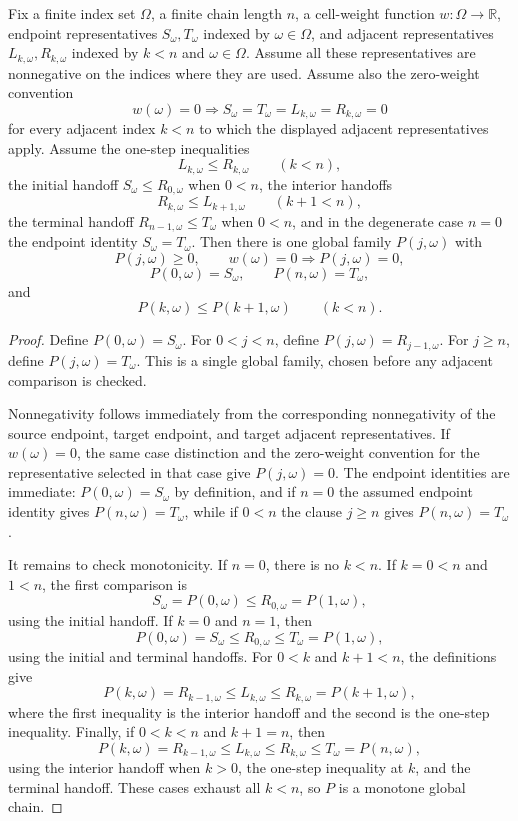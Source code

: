 \begin{helper}
Fix a finite index set \(\Omega\), a finite chain length \(n\), a cell-weight
function \(w:\Omega\to\mathbb R\), endpoint representatives
\(S_\omega,T_\omega\) indexed by \(\omega\in\Omega\), and adjacent
representatives \(L_{k,\omega},R_{k,\omega}\) indexed by \(k<n\) and
\(\omega\in\Omega\).  Assume all these representatives are nonnegative on the
indices where they are used.  Assume also the zero-weight convention
\[
  w(\omega)=0\Rightarrow
  S_\omega=T_\omega=L_{k,\omega}=R_{k,\omega}=0
\]
for every adjacent index \(k<n\) to which the displayed adjacent
representatives apply.  Assume the one-step
inequalities
\[
  L_{k,\omega}\le R_{k,\omega}\qquad(k<n),
\]
the initial handoff \(S_\omega\le R_{0,\omega}\) when \(0<n\), the interior
handoffs
\[
  R_{k,\omega}\le L_{k+1,\omega}\qquad(k+1<n),
\]
the terminal handoff \(R_{n-1,\omega}\le T_\omega\) when \(0<n\), and in the
degenerate case \(n=0\) the endpoint identity \(S_\omega=T_\omega\).
Then there is one global family \(P(j,\omega)\) with
\[
P(j,\omega)\ge0,\qquad w(\omega)=0\Rightarrow P(j,\omega)=0,
\]
\[
P(0,\omega)=S_\omega,\qquad P(n,\omega)=T_\omega,
\]
and
\[
P(k,\omega)\le P(k+1,\omega)\qquad(k<n).
\]
\end{helper}
\begin{proof}
Define \(P(0,\omega)=S_\omega\).  For \(0<j<n\), define
\(P(j,\omega)=R_{j-1,\omega}\).  For \(j\ge n\), define
\(P(j,\omega)=T_\omega\).  This is a single global family, chosen before any
adjacent comparison is checked.

Nonnegativity follows immediately from the corresponding nonnegativity of the
source endpoint, target endpoint, and target adjacent representatives.  If
\(w(\omega)=0\), the same case distinction and the zero-weight convention for
the representative selected in that case give \(P(j,\omega)=0\).  The endpoint
identities are immediate: \(P(0,\omega)=S_\omega\) by definition, and if
\(n=0\) the assumed endpoint identity gives \(P(n,\omega)=T_\omega\), while if
\(0<n\) the clause \(j\ge n\) gives \(P(n,\omega)=T_\omega\).

It remains to check monotonicity.  If \(n=0\), there is no \(k<n\).  If
\(k=0<n\) and \(1<n\), the first comparison is
\[
S_\omega=P(0,\omega)\le R_{0,\omega}=P(1,\omega),
\]
using the initial handoff.  If \(k=0\) and \(n=1\), then
\[
P(0,\omega)=S_\omega\le R_{0,\omega}\le T_\omega=P(1,\omega),
\]
using the initial and terminal handoffs.  For \(0<k\) and \(k+1<n\), the
definitions give
\[
P(k,\omega)=R_{k-1,\omega}\le L_{k,\omega}\le R_{k,\omega}=P(k+1,\omega),
\]
where the first inequality is the interior handoff and the second is the
one-step inequality.  Finally, if \(0<k<n\) and \(k+1=n\), then
\[
P(k,\omega)=R_{k-1,\omega}\le L_{k,\omega}\le R_{k,\omega}\le T_\omega
  =P(n,\omega),
\]
using the interior handoff when \(k>0\), the one-step inequality at \(k\),
and the terminal handoff.  These cases exhaust all \(k<n\), so \(P\) is a
monotone global chain.
\end{proof}
